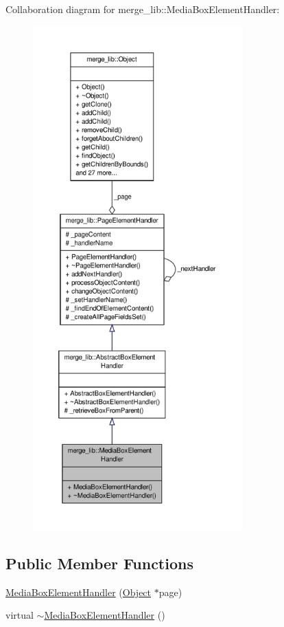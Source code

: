 Collaboration diagram for merge\-\_\-lib\-:\-:Media\-Box\-Element\-Handler\-:
\nopagebreak
\begin{figure}[H]
\begin{center}
\leavevmode
\includegraphics[height=550pt]{d5/d41/classmerge__lib_1_1_media_box_element_handler__coll__graph}
\end{center}
\end{figure}
\subsection*{Public Member Functions}
\begin{DoxyCompactItemize}
\item 
\hyperlink{classmerge__lib_1_1_media_box_element_handler_a41e423aa883a1158afa4c05ca11eeae9}{Media\-Box\-Element\-Handler} (\hyperlink{classmerge__lib_1_1_object}{Object} $\ast$page)
\item 
virtual \hyperlink{classmerge__lib_1_1_media_box_element_handler_a3209f8b1d64faee8c1f254065d4e0823}{$\sim$\-Media\-Box\-Element\-Handler} ()
\end{DoxyCompactItemize}
